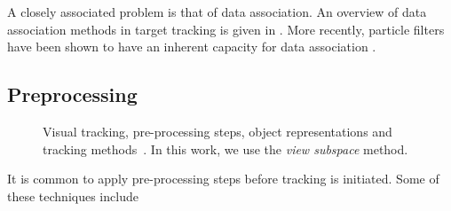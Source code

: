 A closely associated problem is that of data association.  An overview of data association methods in target tracking is given in \cite{1993_JNL_SURVEYcorresp_Cox}.  More recently, particle filters have been shown to have an inherent capacity for data association \cite{1998_JNL_Condensation_IsardBlake}.   

\subsection{Preprocessing}
\begin{figure}[t]
	\center
	\caption{Visual tracking, pre-processing steps, object representations and tracking methods~\cite{2006_JNL_SURVEYtrk_Yilmaz}.  In this work, we use the \emph{view subspace} method.}
	\label{TRK_overviewDiagram}
\end{figure}


It is common to apply pre-processing steps before tracking is initiated.  Some of these techniques include 

